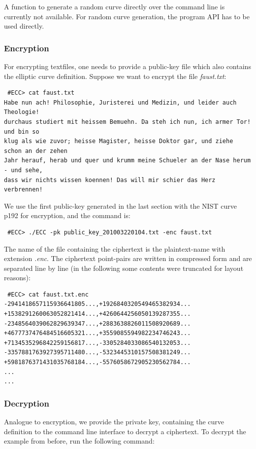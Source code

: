 \documentclass[11pt,english]{article}
\begin{document}
A function to generate a random curve directly over the command line is currently not available. For random curve generation, the program API has to be used directly.

\subsubsection{Encryption}
For encrypting textfiles, one needs to provide a public-key file which also contains the elliptic curve definition. Suppose we want to encrypt the file \emph{faust.txt}:

\begin{verbatim}
 #ECC> cat faust.txt
Habe nun ach! Philosophie, Juristerei und Medizin, und leider auch Theologie!
durchaus studiert mit heissem Bemuehn. Da steh ich nun, ich armer Tor! und bin so
klug als wie zuvor; heisse Magister, heisse Doktor gar, und ziehe schon an der zehen
Jahr herauf, herab und quer und krumm meine Schueler an der Nase herum - und sehe,
dass wir nichts wissen koennen! Das will mir schier das Herz verbrennen!
\end{verbatim}

We use the first public-key generated in the last section with the NIST curve p192 for encryption, and the command is:

\begin{verbatim}
 #ECC> ./ECC -pk public_key_201003220104.txt -enc faust.txt
\end{verbatim}

The name of the file containing the ciphertext is the plaintext-name with extension \emph{.enc}. The ciphertext point-pairs are written in compressed form and are separated line by line (in the following some contents were truncated for layout reasons):

\begin{verbatim}
 #ECC> cat faust.txt.enc
-2941418657115936641805...,+1926840320549465382934...
+1538291260063052821414...,+4260644256050139287355...
-2348564039062829639347...,+2883638826011508920689...
+4677737476484516605321...,+3559085594982234746243...
+7134535296842259156817...,-3305284033086540132053...
-3357881763927395711480...,-5323445310157508381249...
+5981876371431035768184...,-5576058672905230562784...
...
...
\end{verbatim}

\subsubsection{Decryption}
Analogue to encryption, we provide the private key, containing the curve definition to the command line interface to decrypt a ciphertext. To decrypt the example from before, run the following command:
\end{document}
